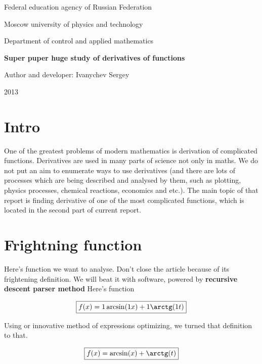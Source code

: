 \documentclass[a4paper, 12pt]{report}
\begin{document}
\begin{titlepage}

\begin{center}
\large{}Federal education agency of Russian Federation

\Large{}Moscow university of physics and technology
\vspace{1.5cm}

Department of control and applied mathematics


\vspace{6cm}
{\bfseries{}\Huge{}Super puper huge study of derivatives of functions}
\vspace{3cm}

{\mdseries{}\large{}Author and developer: Ivanychev Sergey}


\vspace{\fill}
{\rmfamily{}\large{}2013}
\end{center}


\end{titlepage}

\chapter{Intro}

One of the greatest problems of modern mathematics is derivation of complicated functions.
Derivatives are used in many parts of science not only in maths.
We do not put an aim to enumerate ways to use derivatives (and there are lots of processes which are being described and analysed by them, such as plotting, physics processes, chemical reactions, economics and etc.).
The main topic of that report is finding derivative of one of the most complicated functions, which is located in the second part of current report.

\chapter{Frightning function} 

Here's function we want to analyse.
Don't close the article because of its frightening definition.
We will beat it with software, powered by {\bfseries{}recursive descent parser method}
Here's function

$$
\boxed{
f(x) = 
1\arcsin(1x) + 1\arctg(1t)
}
$$

Using or innovative method of expressions optimizing, we turned that definition to that.

$$
\boxed{
f(x) = 
\arcsin(x) + \arctg(t)
}
$$
\end{document}
